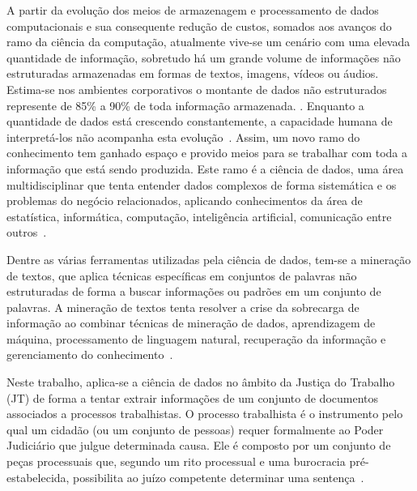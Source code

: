 A partir da evolução dos meios de armazenagem e processamento de dados computacionais e sua consequente redução de custos, somados aos avanços do ramo da ciência da computação, atualmente vive-se um cenário com uma elevada quantidade de informação, sobretudo há um grande volume de informações não estruturadas armazenadas em formas de textos, imagens, vídeos ou áudios. Estima-se nos ambientes corporativos o montante de dados não estruturados represente de 85\% a 90\% de toda informação armazenada. 
\cite{reviewportugues}. Enquanto a quantidade de dados está crescendo constantemente, a capacidade humana de interpretá-los não acompanha esta evolução~\cite{thetextmininghandbook}. Assim, um novo ramo do conhecimento tem ganhado espaço e provido meios para se trabalhar com toda a informação que está sendo produzida. Este ramo é a ciência de dados,  uma área multidisciplinar que tenta entender dados complexos de forma sistemática e os problemas do negócio relacionados, aplicando conhecimentos da área de estatística, informática, computação, inteligência artificial, comunicação entre outros~\cite{artigodatascience}.

Dentre as várias ferramentas utilizadas pela ciência de dados, tem-se a mineração de textos, que aplica técnicas específicas em conjuntos de palavras não estruturadas de forma a buscar informações ou padrões em um conjunto de palavras. A mineração de textos tenta resolver a crise da sobrecarga de informação ao combinar técnicas de mineração de dados, aprendizagem de máquina, processamento de linguagem natural, recuperação da informação e gerenciamento do conhecimento~\cite{thetextmininghandbook}.  

Neste trabalho, aplica-se a ciência de dados no âmbito da Justiça do Trabalho (JT) de forma a tentar extrair informações de um conjunto de documentos associados a processos trabalhistas. O processo trabalhista é o instrumento pelo qual um cidadão (ou um conjunto de pessoas) requer formalmente ao Poder Judiciário que julgue determinada causa. Ele é composto por um conjunto de peças processuais que, segundo um rito processual e uma burocracia pré-estabelecida, possibilita ao juízo competente determinar uma sentença~\cite{processowiki}. 

